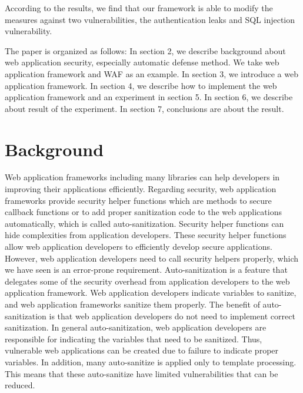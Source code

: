 \documentclass[conference]{IEEEtran}
\begin{document}
According to the results, we find that our framework is able to modify the measures against two vulnerabilities, the authentication leaks and SQL injection vulnerability.

The paper is organized as follows:
In section 2, we describe background about web application security, especially automatic defense method.
We take web application framework and WAF as an example.
In section 3, we introduce a web application framework.
In section 4, we describe how to implement the web application framework and an experiment in section 5.
In section 6, we describe about result of the experiment.
In section 7, conclusions are about the result.
\section{Background}
Web application frameworks including many libraries can help developers in improving their applications efficiently.
Regarding security, web application frameworks provide security helper functions which are methods to secure callback functions or to add proper sanitization code to the web applications automatically, which is called auto-sanitization\cite{weinberger2011systematic}.
Security helper functions can hide complexities from application developers.
These security helper functions allow web application developers to efficiently develop secure applications.
However, web application developers need to call security helpers properly, which we have seen is an error-prone requirement.
Auto-sanitization is a feature that delegates some of the security overhead from application developers to the web application framework.
Web application developers indicate variables to sanitize, and web application frameworks sanitize them properly.
The benefit of auto-sanitization is that web application developers do not need to implement correct sanitization.
In general auto-sanitization, web application developers are responsible for indicating the variables that need to be sanitized.
Thus, vulnerable web applications can be created due to failure to indicate proper variables.
In addition, many auto-sanitize is applied only to template processing.
This means that these auto-sanitize have limited vulnerabilities that can be reduced.
\end{document}
